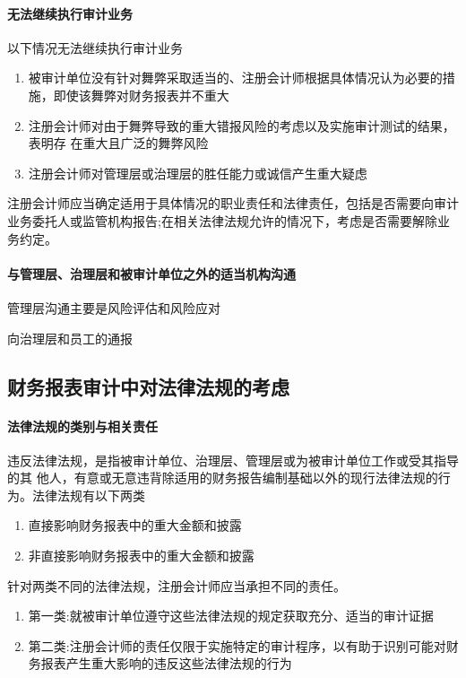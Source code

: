 \documentclass[UTF8,12pt]{ctexart}
\numberwithin{equation}{section} %
\numberwithin{figure}{section}
\numberwithin{table}{section}
\begin{document}
	\paragraph{无法继续执行审计业务}
	以下情况无法继续执行审计业务
	\begin{enumerate}
		\item 被审计单位没有针对舞弊采取适当的、注册会计师根据具体情况认为必要的措施，即使该舞弊对财务报表并不重大
		
		\item 注册会计师对由于舞弊导致的重大错报风险的考虑以及实施审计测试的结果，表明存
		在重大且广泛的舞弊风险
		
		\item 注册会计师对管理层或治理层的胜任能力或诚信产生重大疑虑
	\end{enumerate}
	
	注册会计师应当确定适用于具体情况的职业责任和法律责任，包括是否需要向审计业务委托人或监管机构报告;在相关法律法规允许的情况下，考虑是否需要解除业务约定。
	
	\paragraph{与管理层、治理层和被审计单位之外的适当机构沟通}
	
	管理层沟通主要是风险评估和风险应对 
	
	向治理层和员工的通报
	
	\subsection{财务报表审计中对法律法规的考虑}
	
	\paragraph{法律法规的类别与相关责任}
	违反法律法规，是指被审计单位、治理层、管理层或为被审计单位工作或受其指导的其 他人，有意或无意违背除适用的财务报告编制基础以外的现行法律法规的行为。法律法规有以下两类
	\begin{enumerate}
		\item 直接影响财务报表中的重大金额和披露
		
		\item 非直接影响财务报表中的重大金额和披露
	\end{enumerate}
	
	针对两类不同的法律法规，注册会计师应当承担不同的责任。 
	\begin{enumerate}
		\item 第一类:就被审计单位遵守这些法律法规的规定获取充分、适当的审计证据
		
		\item 第二类:注册会计师的责任仅限于实施特定的审计程序，以有助于识别可能对财务报表产生重大影响的违反这些法律法规的行为
	\end{enumerate}
	
\end{document}
